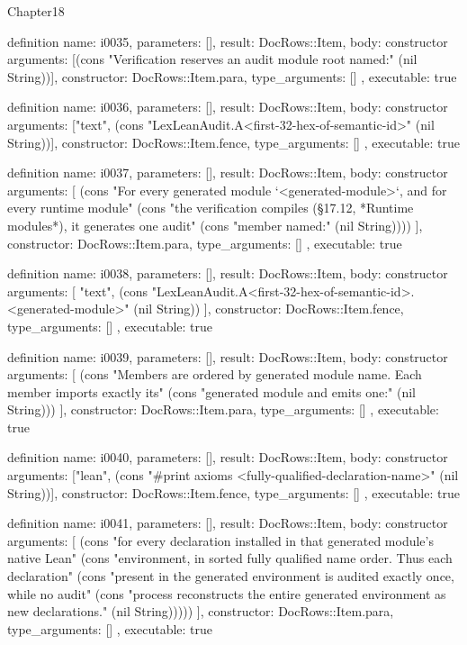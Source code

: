 \begin{lexlean}{Chapter18}
\begin{semanticmodule}
definition{
  name: i0035,
  parameters: [],
  result: DocRows::Item,
  body: constructor{
    arguments: [(cons "Verification reserves an audit module root named:" (nil String))],
    constructor: DocRows::Item.para,
    type_arguments: []
  },
  executable: true
}

definition{
  name: i0036,
  parameters: [],
  result: DocRows::Item,
  body: constructor{
    arguments: ["text", (cons "LexLeanAudit.A<first-32-hex-of-semantic-id>" (nil String))],
    constructor: DocRows::Item.fence,
    type_arguments: []
  },
  executable: true
}

definition{
  name: i0037,
  parameters: [],
  result: DocRows::Item,
  body: constructor{
    arguments: [
      (cons "For every generated module `<generated-module>`, and for every runtime module" (cons "the verification compiles (§17.12, *Runtime modules*), it generates one audit" (cons "member named:" (nil String))))
    ],
    constructor: DocRows::Item.para,
    type_arguments: []
  },
  executable: true
}

definition{
  name: i0038,
  parameters: [],
  result: DocRows::Item,
  body: constructor{
    arguments: [
      "text",
      (cons "LexLeanAudit.A<first-32-hex-of-semantic-id>.<generated-module>" (nil String))
    ],
    constructor: DocRows::Item.fence,
    type_arguments: []
  },
  executable: true
}

definition{
  name: i0039,
  parameters: [],
  result: DocRows::Item,
  body: constructor{
    arguments: [
      (cons "Members are ordered by generated module name. Each member imports exactly its" (cons "generated module and emits one:" (nil String)))
    ],
    constructor: DocRows::Item.para,
    type_arguments: []
  },
  executable: true
}

definition{
  name: i0040,
  parameters: [],
  result: DocRows::Item,
  body: constructor{
    arguments: ["lean", (cons "#print axioms <fully-qualified-declaration-name>" (nil String))],
    constructor: DocRows::Item.fence,
    type_arguments: []
  },
  executable: true
}

definition{
  name: i0041,
  parameters: [],
  result: DocRows::Item,
  body: constructor{
    arguments: [
      (cons "for every declaration installed in that generated module's native Lean" (cons "environment, in sorted fully qualified name order. Thus each declaration" (cons "present in the generated environment is audited exactly once, while no audit" (cons "process reconstructs the entire generated environment as new declarations." (nil String)))))
    ],
    constructor: DocRows::Item.para,
    type_arguments: []
  },
  executable: true
}


\end{semanticmodule}
\end{lexlean}
